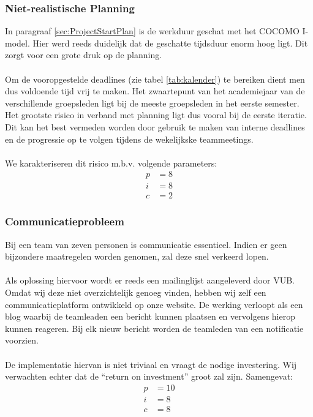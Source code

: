 \subsubsection{Niet-realistische Planning}
In paragraaf \ref{sec:ProjectStartPlan} is de werkduur geschat met het COCOMO I-model. Hier werd reeds duidelijk dat de geschatte tijdsduur enorm hoog ligt. Dit zorgt voor een grote druk op de planning.
\\
\\
Om de vooropgestelde deadlines (zie tabel \ref{tab:kalender}) te bereiken dient men dus voldoende tijd vrij te maken. Het zwaartepunt van het academiejaar van de verschillende groepsleden ligt bij de meeste groepsleden in het eerste semester. Het grootste risico in verband met planning ligt dus vooral bij de eerste iteratie. Dit kan het best vermeden worden door gebruik te maken van interne deadlines en de progressie op te volgen tijdens de wekelijkske teammeetings.
\\
\\
We karakteriseren dit risico m.b.v. volgende parameters:
\begin{align*}
	p &= 8\\
	i &= 8\\
	c &= 2
\end{align*}

\subsubsection{Communicatieprobleem}
Bij een team van zeven personen is communicatie essentieel. Indien er geen bijzondere maatregelen worden genomen, zal deze snel verkeerd lopen.
\\
\\
Als oplossing hiervoor wordt er reeds een mailinglijst aangeleverd door VUB. Omdat wij deze niet overzichtelijk genoeg vinden, hebben wij zelf een communicatieplatform ontwikkeld op onze website. De werking verloopt als een blog waarbij de teamleaden een bericht kunnen plaatsen en vervolgens hierop kunnen reageren. Bij elk nieuw bericht worden de teamleden van een notificatie voorzien.
\\
\\
De implementatie hiervan is niet triviaal en vraagt de nodige investering. Wij verwachten echter dat de ``return on investment'' groot zal zijn. Samengevat:
\begin{align*}
	p &= 10\\
	i &= 8\\
	c &= 8
\end{align*}

